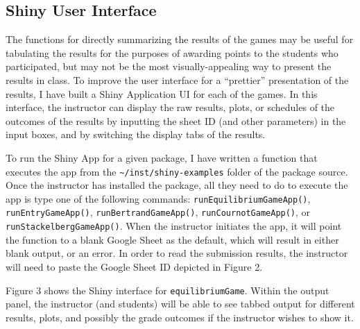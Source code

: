 \documentclass[
]{article}
\begin{document}
\hypertarget{shiny-user-interface}{%
\subsection{Shiny User Interface}\label{shiny-user-interface}}

The functions for directly summarizing the results of the games may be
useful for tabulating the results for the purposes of awarding points to
the students who participated, but may not be the most
visually-appealing way to present the results in class. To improve the
user interface for a ``prettier'' presentation of the results, I have
built a Shiny Application UI for each of the games. In this interface,
the instructor can display the raw results, plots, or schedules of the
outcomes of the results by inputting the sheet ID (and other parameters)
in the input boxes, and by switching the display tabs of the results.

To run the Shiny App for a given package, I have written a function that
executes the app from the
\texttt{\textquotesingle{}\textasciitilde{}/inst/shiny-examples\textquotesingle{}}
folder of the package source. Once the instructor has installed the
package, all they need to do to execute the app is type one of the
following commands:
\texttt{\textquotesingle{}runEquilibriumGameApp()\textquotesingle{}},
\texttt{\textquotesingle{}runEntryGameApp()\textquotesingle{}},
\texttt{\textquotesingle{}runBertrandGameApp()\textquotesingle{}},
\texttt{\textquotesingle{}runCournotGameApp()\textquotesingle{}}, or
\texttt{\textquotesingle{}runStackelbergGameApp()\textquotesingle{}}.
When the instructor initiates the app, it will point the function to a
blank Google Sheet as the default, which will result in either blank
output, or an error. In order to read the submission results, the
instructor will need to paste the Google Sheet ID depicted in Figure 2.

Figure 3 shows the Shiny interface for \texttt{equilibriumGame}. Within
the output panel, the instructor (and students) will be able to see
tabbed output for different results, plots, and possibly the grade
outcomes if the instructor wishes to show it.
\end{document}
